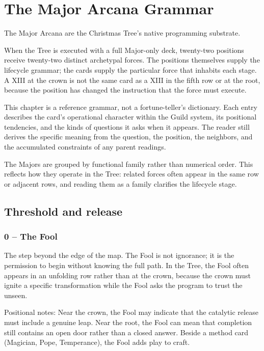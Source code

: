 \chapter{The Major Arcana Grammar}

The Major Arcana are the Christmas Tree's native programming substrate.

When the Tree is executed with a full Major-only deck, twenty-two positions
receive twenty-two distinct archetypal forces. The positions themselves supply
the lifecycle grammar; the cards supply the particular force that inhabits each
stage. A XIII at the crown is not the same card as a XIII in the fifth row or at
the root, because the position has changed the instruction that the force must
execute.

This chapter is a reference grammar, not a fortune-teller's dictionary. Each
entry describes the card's operational character within the Guild system, its
positional tendencies, and the kinds of questions it asks when it appears. The
reader still derives the specific meaning from the question, the position, the
neighbors, and the accumulated constraints of any parent readings.

The Majors are grouped by functional family rather than numerical order. This
reflects how they operate in the Tree: related forces often appear in the same
row or adjacent rows, and reading them as a family clarifies the lifecycle stage.

\section{Threshold and release}

\subsection{0 -- The Fool}

The step beyond the edge of the map. The Fool is not ignorance; it is the
permission to begin without knowing the full path. In the Tree, the Fool often
appears in an unfolding row rather than at the crown, because the crown must
ignite a specific transformation while the Fool asks the program to trust the
unseen.

Positional notes: Near the crown, the Fool may indicate that the catalytic
release must include a genuine leap. Near the root, the Fool can mean that
completion still contains an open door rather than a closed answer. Beside
a method card (Magician, Pope, Temperance), the Fool adds play to craft.

